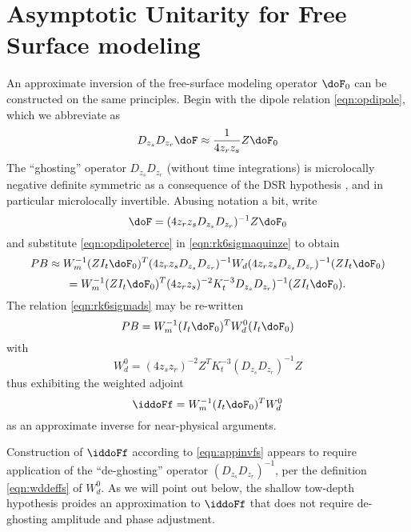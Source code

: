 \section{Asymptotic Unitarity for Free Surface modeling}
An approximate inversion of
the free-surface modeling operator $\doF_0$ can be constructed on the
same principles. Begin with the dipole relation \ref{eqn:opdipole},
which we abbreviate as 
\begin{equation}
\label{eqn:opdipolebis}
D_{z_s}D_{z_r}\doF \approx \frac{1}{4z_rz_s} Z \doF_0
\end{equation}
The ``ghosting'' operator $D_{z_s}D_{z_r}$ (without time integrations)
is microlocally negative
definite symmetric as a consequence of the DSR hypothesis
\cite[]{HouSymes:15}, and in particular microlocally
invertible. Abusing notation a bit, write
\begin{equation}
\label{eqn:opdipoleterce}
\doF = (4z_rz_s D_{z_s}D_{z_r})^{-1} Z \doF_0
\end{equation}
and substitute \ref{eqn:opdipoleterce} in \ref{eqn:rk6sigmaquinze} to
obtain
\[
PB \approx W_m^{-1} (ZI_t\doF_0)^T (4z_rz_s D_{z_s}D_{z_r})^{-1} W_d
(4z_rz_s D_{z_s}D_{z_r})^{-1} (ZI_t \doF_0) 
\]
\begin{equation}
\label{eqn:rk6sigmads}
= W_m^{-1} (ZI_t\doF_0)^T (4z_rz_s)^{-2} K_t^{-3} D_{z_s}D_{z_r})^{-1} (ZI_t \doF_0).
\end{equation}
The relation \ref{eqn:rk6sigmads} may be re-written
\begin{equation}
\label{eqn:rk6sigmadsbis}
PB = W_m^{-1} (I_t\doF_0)^T W_d^0 (I_t\doF_0) 
\end{equation}
with 
\begin{equation}
\label{eqn:wddeffs}
W_d^0 = (4z_sz_r)^{-2} Z^T K_t^{-3} (D_{z_s}D_{z_r})^{-1} Z
\end{equation}
thus exhibiting the weighted adjoint
\begin{equation}
\label{eqn:appinvfs}
\iddoFf= W_m^{-1} (I_t \doF_0)^T W_d^0
\end{equation}
as an approximate inverse for near-physical arguments.

Construction of $\iddoFf$ according to \ref{eqn:appinvfs} appears to
require application of the ``de-ghosting'' operator
$(D_{z_s}D_{z_r})^{-1}$, per the definition \ref{eqn:wddeffs} of
$W_d^0$. As we will point out below, the shallow tow-depth hypothesis
proides an approximation to $\iddoFf$ that does not require
de-ghosting amplitude and phase adjustment.


